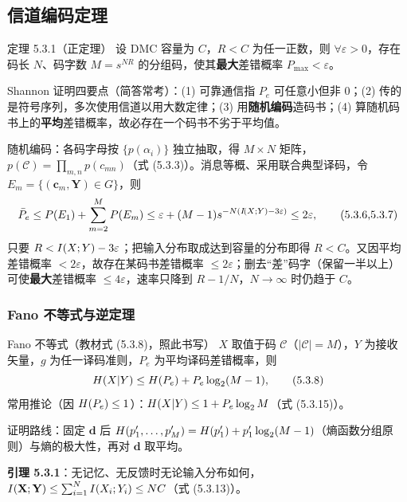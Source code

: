 \subsection{信道编码定理}

\begin{thmbox}{定理 5.3.1（正定理）}
设 DMC 容量为 $C$，$R<C$ 为任一正数，则 $\forall\varepsilon>0$，存在码长 $N$、码字数 $M=s^{NR}$ 的分组码，使其\textbf{最大}差错概率 $P_{\max}<\varepsilon$。
\end{thmbox}

Shannon 证明四要点（简答常考）：(1) 可靠通信指 $P_e$ 可任意小但非 $0$；(2) 传的是符号序列，多次使用信道以用大数定律；(3) 用\textbf{随机编码}造码书；(4) 算随机码书上的\textbf{平均}差错概率，故必存在一个码书不劣于平均值。

随机编码：各码字母按 $\{p(\alpha_i)\}$ 独立抽取，得 $M\times N$ 矩阵，$p(\mathcal{C})=\prod_{m,n}p(c_{mn})$（式 (5.3.3)）。消息等概、采用联合典型译码，令 $E_m=\{(\mathbf{c}_m,\mathbf{Y})\in G\}$，则
\begin{equation}
\bar P_e\le P(E_1)+\sum_{m=2}^{M}P(E_m)\le\varepsilon+(M-1)s^{-N(I\!\left(X;Y\right)-3\varepsilon)}\le2\varepsilon,\tag{5.3.6,5.3.7}
\end{equation}
只要 $R<I\!\left(X;Y\right)-3\varepsilon$；把输入分布取成达到容量的分布即得 $R<C$。又因平均差错概率 $<2\varepsilon$，故存在某码书差错概率 $\le2\varepsilon$；删去“差”码字（保留一半以上）可使\textbf{最大}差错概率 $\le4\varepsilon$，速率只降到 $R-1/N$，$N\to\infty$ 时仍趋于 $C$。

\subsubsection{Fano 不等式与逆定理}

\begin{thmbox}{Fano 不等式（教材式 (5.3.8)，照此书写）}
$X$ 取值于码 $\mathcal{C}$（$|\mathcal{C}|=M$），$Y$ 为接收矢量，$g$ 为任一译码准则，$P_e$ 为平均译码差错概率，则
\begin{equation}
H\!\left(X|Y\right)\le H\!\left(P_e\right)+P_e\log_{2}(M-1),\tag{5.3.8}
\end{equation}
常用推论（因 $H\!\left(P_e\right)\le1$）：$H\!\left(X|Y\right)\le1+P_e\log_{2} M$（式 (5.3.15)）。
\end{thmbox}

证明路线：固定 $\mathbf{d}$ 后 $H(p'_1,\dots,p'_M)=H(p'_1)+p'_1\log_{2}(M-1)$（熵函数分组原则）与熵的极大性，再对 $\mathbf{d}$ 取平均。

\textbf{引理 5.3.1}：无记忆、无反馈时无论输入分布如何，$I\!\left(\mathbf{X};\mathbf{Y}\right)\le\sum_{i=1}^NI\!\left(X_i;Y_i\right)\le NC$（式 (5.3.13)）。

